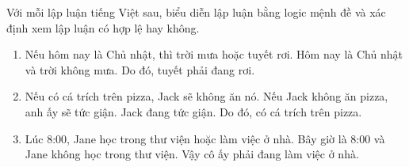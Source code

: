 \begin{exercise}
Với mỗi lập luận tiếng Việt sau, biểu diễn lập luận bằng logic mệnh đề và xác định xem lập luận có hợp lệ hay không.
\begin{enumerate}[label=\alph*)]
\item Nếu hôm nay là Chủ nhật, thì trời mưa hoặc tuyết rơi. Hôm nay là Chủ nhật và trời không mưa. Do đó, tuyết phải đang rơi.
\item Nếu có cá trích trên pizza, Jack sẽ không ăn nó. Nếu Jack không ăn pizza, anh ấy sẽ tức giận. Jack đang tức giận. Do đó, có cá trích trên pizza.
\item Lúc 8:00, Jane học trong thư viện hoặc làm việc ở nhà. Bây giờ là 8:00 và Jane không học trong thư viện. Vậy cô ấy phải đang làm việc ở nhà.
\end{enumerate}
\end{exercise}
